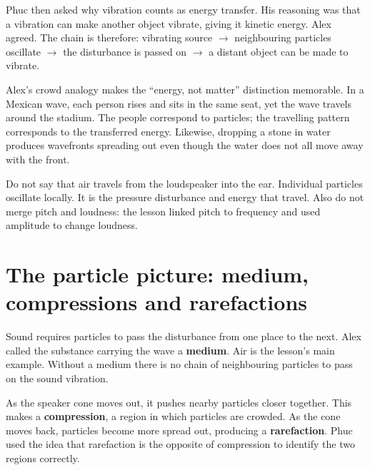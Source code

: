 \documentclass[11pt,a4paper]{article}
\newcommand{\trap}[1]{\begin{mistakebox}#1\end{mistakebox}}
\begin{document}
Phuc then asked why vibration counts as energy transfer. His reasoning was that a vibration can make another object vibrate, giving it kinetic energy. Alex agreed. The chain is therefore: vibrating source $\rightarrow$ neighbouring particles oscillate $\rightarrow$ the disturbance is passed on $\rightarrow$ a distant object can be made to vibrate.

Alex's crowd analogy makes the ``energy, not matter'' distinction memorable. In a Mexican wave, each person rises and sits in the same seat, yet the wave travels around the stadium. The people correspond to particles; the travelling pattern corresponds to the transferred energy. Likewise, dropping a stone in water produces wavefronts spreading out even though the water does not all move away with the front.

\trap{Do not say that air travels from the loudspeaker into the ear. Individual particles oscillate locally. It is the pressure disturbance and energy that travel. Also do not merge pitch and loudness: the lesson linked pitch to frequency and used amplitude to change loudness.}

\section{The particle picture: medium, compressions and rarefactions}
Sound requires particles to pass the disturbance from one place to the next. Alex called the substance carrying the wave a \textbf{medium}. Air is the lesson's main example. Without a medium there is no chain of neighbouring particles to pass on the sound vibration.

As the speaker cone moves out, it pushes nearby particles closer together. This makes a \textbf{compression}, a region in which particles are crowded. As the cone moves back, particles become more spread out, producing a \textbf{rarefaction}. Phuc used the idea that rarefaction is the opposite of compression to identify the two regions correctly.

\begin{center}
\end{center}
\end{document}
